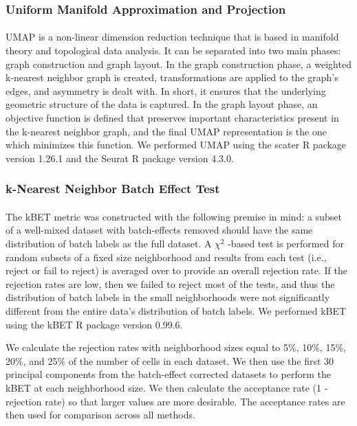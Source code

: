 \documentclass[
12pt, %
letterpaper, %
oneside, %
headinclude,footinclude, %
BCOR5mm, %
]{scrartcl}
\begin{document}
\subsubsection*{Uniform Manifold Approximation and Projection}

\paragraph*{}
UMAP is a non-linear dimension reduction technique \citep{mcinnes2018umap} that is based in manifold theory and topological data analysis. It can be separated into two main phases: graph construction and graph layout. In the graph construction phase, a weighted k-nearest neighbor graph is created, transformations are applied to the graph's edges, and asymmetry is dealt with. In short, it ensures that the underlying geometric structure of the data is captured. In the graph layout phase, an objective function is defined that preserves important characteristics present in the k-nearest neighbor graph, and the final UMAP representation is the one which minimizes this function. We performed UMAP using the scater R package \citep{davis2017scater} version 1.26.1 and the Seurat R package \citep{stuart2019comprehensive} version 4.3.0.

\subsubsection*{k-Nearest Neighbor Batch Effect Test}

\paragraph*{}
The kBET metric \citep{buttner2019test} was constructed with the following premise in mind: a subset of a well-mixed dataset with batch-effects removed should have the same distribution of batch labels as the full dataset. A $\chi^2$ -based test is performed for random subsets of a fixed size neighborhood and results from each test (i.e., reject or fail to reject) is averaged over to provide an overall rejection rate. If the rejection rates are low, then we failed to reject most of the tests, and thus the distribution of batch labels in the small neighborhoods were not significantly different from the entire data's distribution of batch labels. We performed kBET using the kBET R package \citep{buttner2017kbet} version 0.99.6.

We calculate the rejection rates with neighborhood sizes equal to 5\%, 10\%, 15\%, 20\%, and 25\% of the number of cells in each dataset. We then use the first 30 principal components from the batch-effect corrected datasets to perform the kBET at each neighborhood size. We then calculate the acceptance rate (1 - rejection rate) so that larger values are more desirable. The acceptance rates are then used for comparison across all methods.
\end{document}
